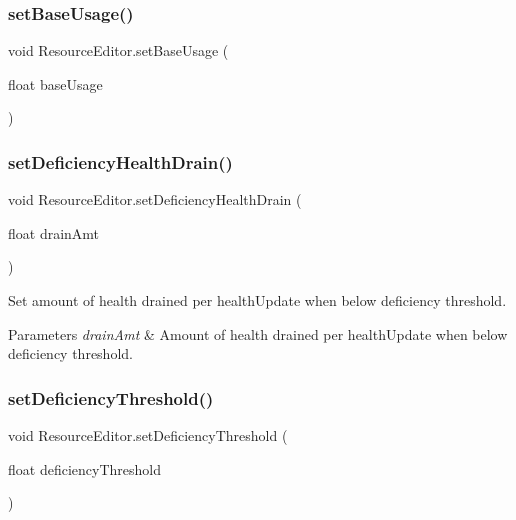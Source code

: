 \subsubsection{\texorpdfstring{set\+Base\+Usage()}{setBaseUsage()}}
{\footnotesize\ttfamily void Resource\+Editor.\+set\+Base\+Usage (\begin{DoxyParamCaption}\item[{float}]{base\+Usage }\end{DoxyParamCaption})}

\mbox{\label{class_resource_editor_a7b6f57a8791a396d56a2d08cea1db14b}} 
\subsubsection{\texorpdfstring{set\+Deficiency\+Health\+Drain()}{setDeficiencyHealthDrain()}}
{\footnotesize\ttfamily void Resource\+Editor.\+set\+Deficiency\+Health\+Drain (\begin{DoxyParamCaption}\item[{float}]{drain\+Amt }\end{DoxyParamCaption})}



Set amount of health drained per health\+Update when below deficiency threshold. 


\begin{DoxyParams}{Parameters}
{\em drain\+Amt} & Amount of health drained per health\+Update when below deficiency threshold.\\
\hline
\end{DoxyParams}
\mbox{\label{class_resource_editor_a98153dea69b0e350ae2ac75bf328891c}} 
\subsubsection{\texorpdfstring{set\+Deficiency\+Threshold()}{setDeficiencyThreshold()}}
{\footnotesize\ttfamily void Resource\+Editor.\+set\+Deficiency\+Threshold (\begin{DoxyParamCaption}\item[{float}]{deficiency\+Threshold }\end{DoxyParamCaption})}



